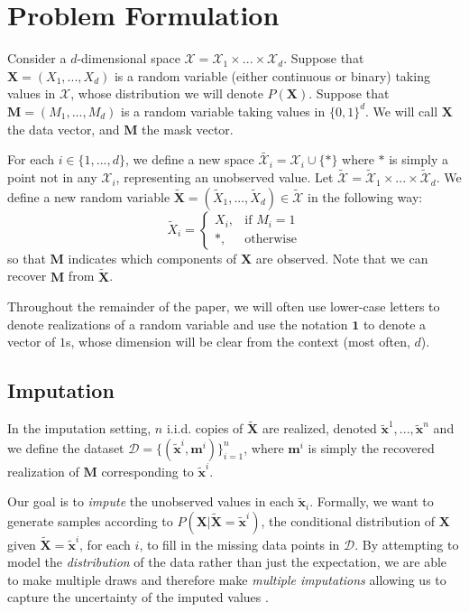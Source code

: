 \documentclass{article}
\begin{document}
\section{Problem Formulation} \label{sect:problem_formulate}
Consider a $d$-dimensional space $\mathcal{X} = \mathcal{X}_1 \times ... \times \mathcal{X}_d$. Suppose that $\mathbf{X} = (X_1, ..., X_d)$ is a random variable (either continuous or binary) taking values in $\mathcal{X}$, whose distribution we will denote $P(\mathbf{X})$. Suppose that $\mathbf{M} = (M_1, ..., M_d)$ is a random variable taking values in $\{0, 1\}^d$. We will call $\mathbf{X}$ the data vector, and $\mathbf{M}$ the mask vector.  

For each $i \in \{1, ..., d\}$, we define a new space $\tilde{\mathcal{X}_i} = \mathcal{X}_i \cup \{*\}$ where $*$ is simply a point not in any $\mathcal{X}_i$, representing an unobserved value. Let $\tilde{\mathcal{X}} = \tilde{\mathcal{X}}_1 \times ... \times \tilde{\mathcal{X}}_d$.  We define a new random variable $\tilde{\mathbf{X}} = (\tilde{X}_1, ..., \tilde{X}_d) \in \tilde{\mathcal{X}}$ in the following way:
\begin{equation} \label{eq:xtilde}
\tilde{X}_i = 
\begin{cases}
X_i, & \text{if } M_i = 1\\
*, & \text{otherwise}
\end{cases}
\end{equation}
so that $\mathbf{M}$ indicates which components of $\mathbf{X}$ are observed. Note that we can recover $\mathbf{M}$ from $\tilde{\mathbf{X}}$.

Throughout the remainder of the paper, we will often use lower-case letters to denote realizations of a random variable and use the notation $\mathbf{1}$ to denote a vector of $1$s, whose dimension will be clear from the context (most often, $d$).

\subsection{Imputation}
In the imputation setting, $n$ i.i.d. copies of $\tilde{\mathbf{X}}$ are realized, denoted $\tilde{\mathbf{x}}^1, ..., \tilde{\mathbf{x}}^n$ and we define the dataset $\mathcal{D} = \{(\tilde{\mathbf{x}}^i, \mathbf{m}^i)\}_{i=1}^n$, where $\mathbf{m}^i$ is simply the recovered realization of $\mathbf{M}$ corresponding to $\tilde{\mathbf{x}}^i$. 

Our goal is to {\em impute} the unobserved values in each $\tilde{\mathbf{x}}_i$. Formally, we want to generate samples according to $P(\mathbf{X} | \tilde{\mathbf{X}} = \tilde{\mathbf{x}}^i)$, the conditional distribution of $\mathbf{X}$ given $\tilde{\mathbf{X}} = \tilde{\mathbf{x}}^i$, for each $i$, to fill in the missing data points in $\mathcal{D}$. By attempting to model the {\em distribution} of the data rather than just the expectation, we are able to make multiple draws and therefore make {\em multiple imputations} allowing us to capture the uncertainty of the imputed values \cite{MICE, MICE-R, Rubin}.
\end{document}
